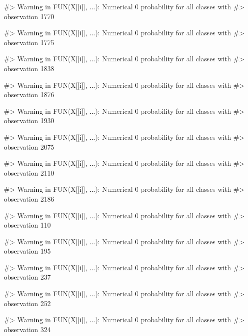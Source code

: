 \begin{Schunk}
\begin{Soutput}
#> Warning in FUN(X[[i]], ...): Numerical 0 probability for all classes with
#> observation 1770
\end{Soutput}
\begin{Soutput}
#> Warning in FUN(X[[i]], ...): Numerical 0 probability for all classes with
#> observation 1775
\end{Soutput}
\begin{Soutput}
#> Warning in FUN(X[[i]], ...): Numerical 0 probability for all classes with
#> observation 1838
\end{Soutput}
\begin{Soutput}
#> Warning in FUN(X[[i]], ...): Numerical 0 probability for all classes with
#> observation 1876
\end{Soutput}
\begin{Soutput}
#> Warning in FUN(X[[i]], ...): Numerical 0 probability for all classes with
#> observation 1930
\end{Soutput}
\begin{Soutput}
#> Warning in FUN(X[[i]], ...): Numerical 0 probability for all classes with
#> observation 2075
\end{Soutput}
\begin{Soutput}
#> Warning in FUN(X[[i]], ...): Numerical 0 probability for all classes with
#> observation 2110
\end{Soutput}
\begin{Soutput}
#> Warning in FUN(X[[i]], ...): Numerical 0 probability for all classes with
#> observation 2186
\end{Soutput}
\begin{Soutput}
#> Warning in FUN(X[[i]], ...): Numerical 0 probability for all classes with
#> observation 110
\end{Soutput}
\begin{Soutput}
#> Warning in FUN(X[[i]], ...): Numerical 0 probability for all classes with
#> observation 195
\end{Soutput}
\begin{Soutput}
#> Warning in FUN(X[[i]], ...): Numerical 0 probability for all classes with
#> observation 237
\end{Soutput}
\begin{Soutput}
#> Warning in FUN(X[[i]], ...): Numerical 0 probability for all classes with
#> observation 252
\end{Soutput}
\begin{Soutput}
#> Warning in FUN(X[[i]], ...): Numerical 0 probability for all classes with
#> observation 324
\end{Soutput}

\end{Schunk}
